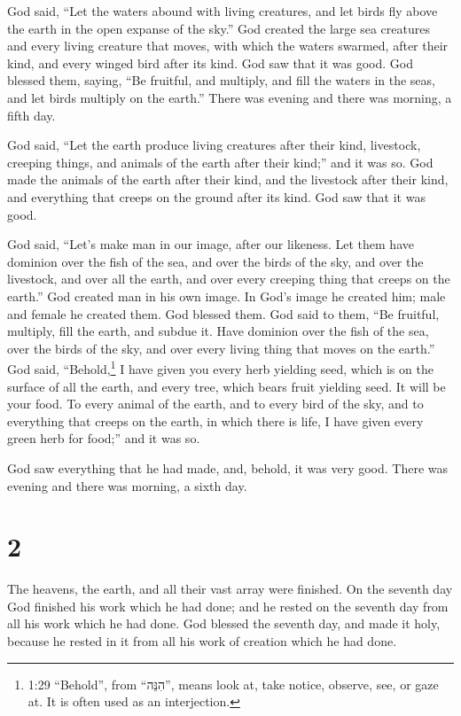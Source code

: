  God said, ``Let the waters abound with living creatures,
and let birds fly above the earth in the open expanse of the sky.''
 God created the large sea creatures and every living
creature that moves, with which the waters swarmed, after their kind,
and every winged bird after its kind. God saw that it was good.
 God blessed them, saying, ``Be fruitful, and multiply, and
fill the waters in the seas, and let birds multiply on the earth.''
 There was evening and there was morning, a fifth day.

 God said, ``Let the earth produce living creatures after
their kind, livestock, creeping things, and animals of the earth after
their kind;'' and it was so.  God made the animals of the
earth after their kind, and the livestock after their kind, and
everything that creeps on the ground after its kind. God saw that it was
good.

 God said, ``Let's make man in our image, after our
likeness. Let them have dominion over the fish of the sea, and over the
birds of the sky, and over the livestock, and over all the earth, and
over every creeping thing that creeps on the earth.''  God
created man in his own image. In God's image he created him; male and
female he created them.  God blessed them. God said to
them, ``Be fruitful, multiply, fill the earth, and subdue it. Have
dominion over the fish of the sea, over the birds of the sky, and over
every living thing that moves on the earth.''  God said,
``Behold,\footnote{1:29 ``Behold'', from ``הִנֵּה'', means look at, take
  notice, observe, see, or gaze at. It is often used as an interjection.}
I have given you every herb yielding seed, which is on the surface of
all the earth, and every tree, which bears fruit yielding seed. It will
be your food.  To every animal of the earth, and to every
bird of the sky, and to everything that creeps on the earth, in which
there is life, I have given every green herb for food;'' and it was so.

 God saw everything that he had made, and, behold, it was
very good. There was evening and there was morning, a sixth day.

\hypertarget{section-1}{%
\section{2}\label{section-1}}

 The heavens, the earth, and all their vast array were
finished.  On the seventh day God finished his work which he
had done; and he rested on the seventh day from all his work which he
had done.  God blessed the seventh day, and made it holy,
because he rested in it from all his work of creation which he had done.

